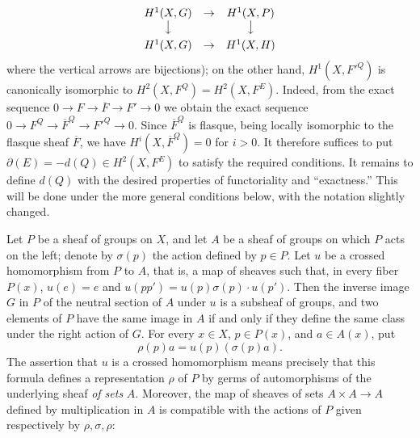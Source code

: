 
\[
\begin{array}{ccc}
H^1(X,G)&\to&H^1(X,P)\\
\big\downarrow&&\big\downarrow\\[0.45em]
H^1(X,G)&\to&H^1(X,H)
\end{array}
\]
where the vertical arrows are bijections); on the other hand,
$H^1(X,{F'}^Q)$ is canonically isomorphic to
$H^2(X,F^Q)=H^2(X,F^E)$. Indeed, from the exact sequence
$0\to F\to\overline F\to F'\to0$
we obtain the exact sequence
$0\to F^Q\to\overline F^Q\to {F'}^Q\to0$.
Since $\overline F^Q$ is flasque, being locally isomorphic to the flasque sheaf
$\overline F$, we have $H^i(X,\overline F^Q)=0$ for $i>0$.
It therefore suffices to put
$\partial(E)=-d(Q)\in H^2(X,F^E)$
to satisfy the required conditions. It remains to define $d(Q)$ with the
desired properties of functoriality and ``exactness.'' This will be done under
the more general conditions below, with the notation slightly changed.

Let $P$ be a sheaf of groups on $X$, and let $A$ be a sheaf of groups on which
$P$ acts on the left; denote by $\sigma(p)$ the action defined by $p\in P$.
Let $u$ be a crossed homomorphism from $P$ to $A$, that is, a map of sheaves
such that, in every fiber $P(x)$,
$u(e)=e$ and $u(pp')=u(p)\sigma(p)\mathbin{\cdot}u(p')$. Then the inverse
image $G$ in $P$ of the neutral section of $A$ under $u$ is a subsheaf of
groups, and two elements of $P$ have the same image in $A$ if and only if they
define the same class under the right action of $G$.
For every $x\in X$, $p\in P(x)$, and $a\in A(x)$, put
\[
\rho(p)a=u(p)(\sigma(p)a).
\]
The assertion that $u$ is a crossed homomorphism means precisely that this
formula defines a representation $\rho$ of $P$ by germs of automorphisms of
the underlying sheaf \textit{of sets} $A$. Moreover, the map of sheaves of sets
$A\times A\to A$ defined by multiplication in $A$ is compatible
with the actions of $P$ given respectively by $\rho,\sigma,\rho$:

